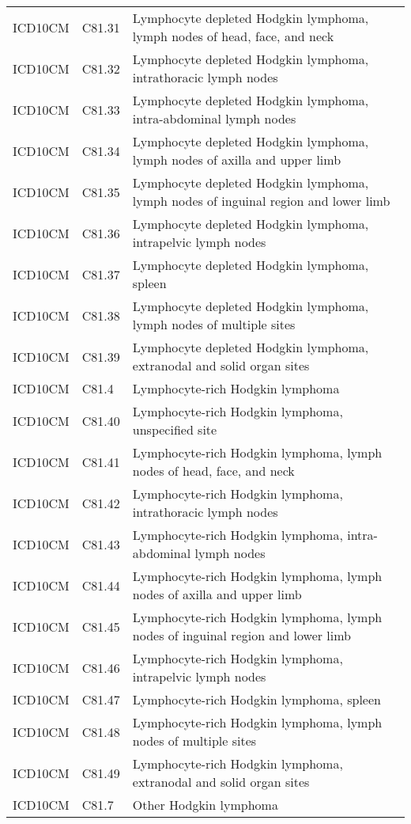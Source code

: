 \begin{table}[ht]
\begin{tabular}{lll}
  ICD10CM & C81.31 & Lymphocyte depleted Hodgkin lymphoma, lymph nodes of head, face, and neck \\ 
  ICD10CM & C81.32 & Lymphocyte depleted Hodgkin lymphoma, intrathoracic lymph nodes \\ 
  ICD10CM & C81.33 & Lymphocyte depleted Hodgkin lymphoma, intra-abdominal lymph nodes \\ 
  ICD10CM & C81.34 & Lymphocyte depleted Hodgkin lymphoma, lymph nodes of axilla and upper limb \\ 
  ICD10CM & C81.35 & Lymphocyte depleted Hodgkin lymphoma, lymph nodes of inguinal region and lower limb \\ 
  ICD10CM & C81.36 & Lymphocyte depleted Hodgkin lymphoma, intrapelvic lymph nodes \\ 
  ICD10CM & C81.37 & Lymphocyte depleted Hodgkin lymphoma, spleen \\ 
  ICD10CM & C81.38 & Lymphocyte depleted Hodgkin lymphoma, lymph nodes of multiple sites \\ 
  ICD10CM & C81.39 & Lymphocyte depleted Hodgkin lymphoma, extranodal and solid organ sites \\ 
  ICD10CM & C81.4 & Lymphocyte-rich Hodgkin lymphoma \\ 
  ICD10CM & C81.40 & Lymphocyte-rich Hodgkin lymphoma, unspecified site \\ 
  ICD10CM & C81.41 & Lymphocyte-rich Hodgkin lymphoma, lymph nodes of head, face, and neck \\ 
  ICD10CM & C81.42 & Lymphocyte-rich Hodgkin lymphoma, intrathoracic lymph nodes \\ 
  ICD10CM & C81.43 & Lymphocyte-rich Hodgkin lymphoma, intra-abdominal lymph nodes \\ 
  ICD10CM & C81.44 & Lymphocyte-rich Hodgkin lymphoma, lymph nodes of axilla and upper limb \\ 
  ICD10CM & C81.45 & Lymphocyte-rich Hodgkin lymphoma, lymph nodes of inguinal region and lower limb \\ 
  ICD10CM & C81.46 & Lymphocyte-rich Hodgkin lymphoma, intrapelvic lymph nodes \\ 
  ICD10CM & C81.47 & Lymphocyte-rich Hodgkin lymphoma, spleen \\ 
  ICD10CM & C81.48 & Lymphocyte-rich Hodgkin lymphoma, lymph nodes of multiple sites \\ 
  ICD10CM & C81.49 & Lymphocyte-rich Hodgkin lymphoma, extranodal and solid organ sites \\ 
  ICD10CM & C81.7 & Other Hodgkin lymphoma \\ 

\end{tabular}
\end{table}
